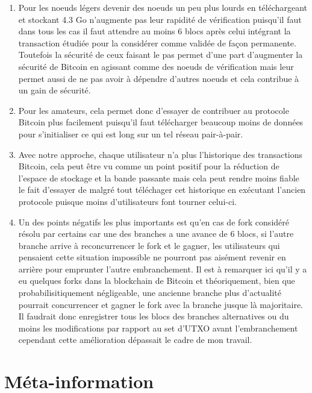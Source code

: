 \documentclass[12pt,a4paper]{article}
\begin{document}
	\begin{enumerate}
		\item Pour les noeuds légers devenir des noeuds un peu plus lourds en téléchargeant et stockant 4.3 Go n'augmente pas leur rapidité de vérification puisqu'il faut dans tous les cas il faut attendre au moins 6 blocs après celui intégrant la transaction étudiée pour la considérer comme validée de façon permanente. Toutefois la sécurité de ceux faisant le pas permet d'une part d'augmenter la sécurité de Bitcoin en agissant comme des noeuds de vérification mais leur permet aussi de ne pas avoir à dépendre d'autres noeuds et cela contribue à un gain de sécurité.
		\item Pour les amateurs, cela permet donc d'essayer de contribuer au protocole Bitcoin plus facilement puisqu'il faut télécharger beaucoup moins de données pour s'initialiser ce qui est long sur un tel réseau pair-à-pair.
		\item Avec notre approche, chaque utilisateur n'a plus l'historique des transactions Bitcoin, cela peut être vu comme un point positif pour la réduction de l'espace de stockage et la bande passante mais cela peut rendre moins fiable le fait d'essayer de malgré tout téléchager cet historique en exécutant l'ancien protocole puisque moins d'utilisateurs font tourner celui-ci.
		\item Un des points négatifs les plus importants est qu'en cas de fork considéré résolu par certains car une des branches a une avance de 6 blocs, si l'autre branche arrive à reconcurrencer le fork et le gagner, les utilisateurs qui pensaient cette situation impossible ne pourront pas aisément revenir en arrière pour emprunter l'autre embranchement. Il est à remarquer ici qu'il y a eu quelques forks dans la blockchain de Bitcoin et théoriquement, bien que probabilisitiquement négligeable, une ancienne branche plus d'actualité pourrait concurrencer et gagner le fork avec la branche jusque là majoritaire. Il faudrait donc enregistrer tous les blocs des branches alternatives ou du moins les modifications par rapport au set d'UTXO avant l'embranchement cependant cette amélioration dépassait le cadre de mon travail. %
	\end{enumerate}
	
	\section{Méta-information} %
	
\end{document}
